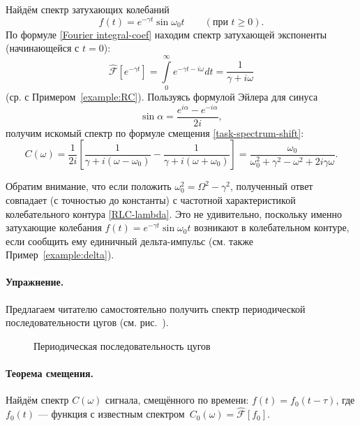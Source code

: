 \begin{lab:example}\label{example:exp}
Найдём спектр затухающих колебаний
\begin{equation*}
f(t) = e^{-\gamma t} \sin \omega_0 t\qquad (\text{при~}t\ge 0).
\end{equation*}
По формуле \eqref{Fourier integral-coef} находим спектр затухающей
экспоненты (начинающейся с $t=0$):
\begin{equation*}
\hat{\mathcal{F}}[e^{-\gamma t}] =
\int\limits_0^{\infty} e^{-\gamma t - i\omega} dt =
\frac{1}{\gamma + i\omega}
\end{equation*}
(ср. с Примером~\ref{example:RC}).
Пользуясь формулой Эйлера для синуса
\begin{equation*}
\sin \alpha = \frac{e^{i\alpha} - e^{-i\alpha}}{2i},
\end{equation*}
получим искомый спектр по формуле смещения \eqref{task-spectrum-shift}:
\begin{equation*}
C(\omega) = \frac{1}{2i} \left[\frac{1}{\gamma + i(\omega-\omega_0)} -
\frac{1}{\gamma + i(\omega+\omega_0)}\right] =
\frac{\omega_0}{\omega_0^2 + \gamma^2 - \omega^2 +2i\gamma \omega }.
\end{equation*}

Обратим внимание, что если положить $\omega_0^2 =\Omega^2 - \gamma^2$,
полученный ответ совпадает (с точностью до константы)
с частотной характеристикой колебательного контура \eqref{RLC-lambda}.
Это не удивительно, поскольку именно затухающие колебания
$f(t) = e^{-\gamma t} \sin \omega_0 t$
возникают в колебательном контуре, если сообщить ему единичный дельта-импульс
(см. также Пример~\ref{example:delta}).
\end{lab:example}

\paragraph{Упражнение.} Предлагаем читателю самостоятельно получить
спектр периодической последовательности цугов (см. рис.~).

\begin{figure}[h!]
\hfil
    \caption{Периодическая последовательность цугов}
\end{figure}

\paragraph{Теорема смещения.}
Найдём спектр $C(\omega)$ сигнала, смещённого по времени: $f(t)=f_0(t-\tau)$,
где $f_0(t)$ --- функция с известным спектром~$C_0(\omega)=\hat{\mathcal{F}}[f_0]$.

